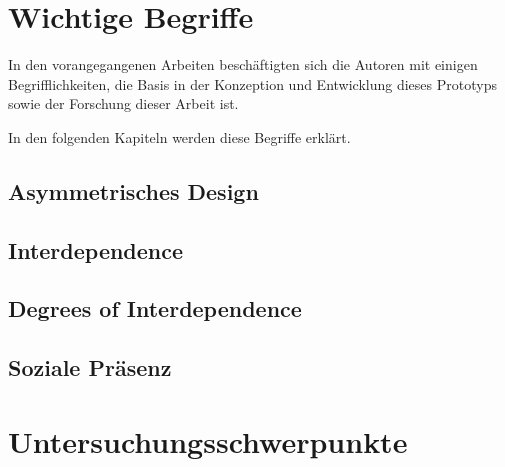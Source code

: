 

\section{Wichtige Begriffe}
In den vorangegangenen Arbeiten beschäftigten sich die Autoren mit einigen Begrifflichkeiten, die Basis in der Konzeption und Entwicklung dieses Prototyps sowie der Forschung dieser Arbeit ist. 

In den folgenden Kapiteln werden diese Begriffe erklärt.

\subsection{Asymmetrisches Design}

\subsection{Interdependence}

\subsection{Degrees of Interdependence}

\subsection{Soziale Präsenz}



\section{Untersuchungsschwerpunkte}

